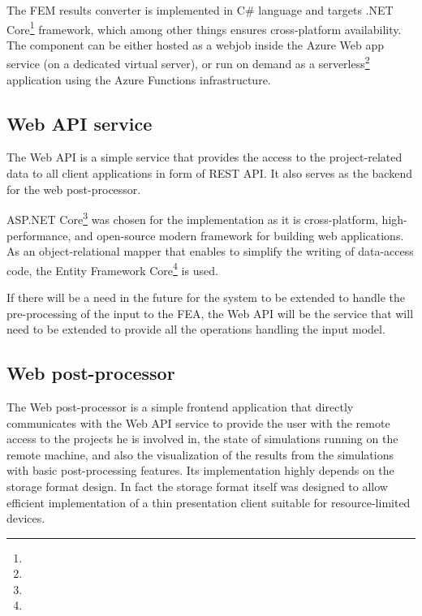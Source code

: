 The FEM results converter is implemented in C\# language and targets .NET Core\footnote{} framework, which among other things ensures cross-platform availability. The component can be either hosted as a webjob inside the Azure Web app service (on a dedicated virtual server), or run on demand as a serverless\footnote{} application using the Azure Functions infrastructure.

\subsection*{Web API service}

The Web API is a simple service that provides the access to the project-related data to all client applications in form of REST API. It also serves as the backend for the web post-processor.

ASP.NET Core\footnote{} was chosen for the implementation as it is cross-platform, high-performance, and open-source modern framework for building web applications. As an object-relational mapper that enables to simplify the writing of data-access code, the Entity Framework Core\footnote{} is used.

If there will be a need in the future for the system to be extended to handle the pre-processing of the input to the FEA, the Web API will be the service that will need to be extended to provide all the operations handling the input model.

\subsection*{Web post-processor}

The Web post-processor is a simple frontend application that directly communicates with the Web API service to provide the user with the remote access to the projects he is involved in, the state of simulations running on the remote machine, and also the visualization of the results from the simulations with basic post-processing features. Its implementation highly depends on the storage format design. In fact the storage format itself was designed to allow efficient implementation of a thin presentation client suitable for resource-limited devices.

